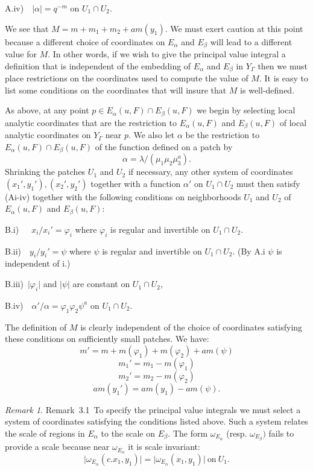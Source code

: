 \documentclass{memo-l}
\theoremstyle{definition}
\theoremstyle{remark}
\newtheorem{remark}[theorem]{Remark}
\numberwithin{section}{chapter}
\numberwithin{equation}{chapter}
\begin{document}
\smallskip
\noindent
A.iv)\ \  $\vert {\alpha}\vert = q^{-m}$ on $U_{1} \cap U_{2}$.

\medskip
   We see that $M  =  m+m_{1}+m_{2}+am(y_{1})$.  We must exert caution at
this point because a different choice of coordinates on $E_{{\alpha}}$ and
$E_{{\beta}}$ will lead to a different value for $M$.  In other words, if
we wish to give the principal value integral a definition that is
independent of the embedding of $E_{{\alpha}}$ and $E_{{\beta}}$ in
$Y_{{\Gamma}}$ then we must place restrictions on the coordinates used to
compute the value of $M$.  It is easy to list some conditions on the
coordinates that will insure that $M$ is well-defined.
 

   As above, at any point $p \in E_{{\alpha}}(u,F) \cap
E_{{\beta}}(u,F)$ we begin by selecting local analytic coordinates that are
the restriction to $E_{{\alpha}}(u,F)$ and $E_{{\beta}}(u,F)$ of local
analytic coordinates on $Y_{{\Gamma}}$ near $p$.  We also let ${\alpha}$ be
the restriction to $E_{{\alpha}}(u,F) \cap E_{{\beta}}(u,F)$ of the
function defined on a patch by
$$
{\alpha}  =  {\lambda}/({\mu}_{1}{\mu}_{2}{\mu}_{3}^{a}) .
$$
Shrinking the patches $U_{1}$ and $U_{2}$ if necessary, any other system of
coordinates $(x_{1}',y_{1}'), (x_{2}',y_{2}')$ together with a function
${\alpha}'$ on $U_{1} \cap U_{2}$ must then satisfy (Ai-iv) together with
the following conditions on neighborhoods $U_{1}$ and $U_{2}$ of
$E_{{\alpha}}(u,F)$ and $E_{{\beta}}(u,F) :$


\noindent
B.i)\ \ \  $x_{i}/x_{i}'  =  {\varphi}_{i}$ where ${\varphi}_{i}$ is regular and
invertible on $U_{1} \cap U_{2}$.

\noindent
B.ii)\ \  $y_{i}/y_{i}'  =  \psi$ where $\psi$ is
regular and invertible on $U_{1} \cap U_{2}$.  (By A.i $\psi$
is independent of i.)

\noindent
B.iii)\  $\vert\varphi_{i}\vert$ and $\vert \psi \vert$ are
constant on $U_{1} \cap U_{2}$,


\noindent
B.iv)\ \  ${\alpha}'/{\alpha}  =  {\varphi}_{1}{\varphi}_{2}{\psi}^{a}$ on 
$U_{1} \cap U_{2}$.


\noindent
The definition of $M$ is clearly independent of the choice of coordinates
satisfying these conditions on sufficiently small patches.  We have:
$$
m'  =  m + m({\varphi}_{1}) + m({\varphi}_{2}) + am(\psi)
$$
$$
m_{1}'  =  m_{1} - m({\varphi}_{1})
$$
$$
m_{2}'  =  m_{2} - m({\varphi}_{2})
$$
$$
am(y_{1}')  =  am(y_{1}) - am(\psi).
$$ 

\begin{remark}{Remark\  3.1}\ To specify the principal value integrals we must
select a system of coordinates satisfying the conditions listed above.
Such a system relates the scale of regions in $E_{{\alpha}}$ to the scale
on $E_{{\beta}}$.  The form ${\omega}_{E_\alpha}$ (resp. ${\omega}_{E_\beta} )$ fails to provide a scale because near
${\omega}_{E_\alpha}$ it is scale invariant:
$$
\vert {\omega}_{E_\alpha} (c.x_{1},y_{1})\vert  =  \vert {\omega}_{E_\alpha}
(x_{1},y_{1})\vert\ {\text{on}}\ U_{1}.
$$
\end{remark}
\end{document}
